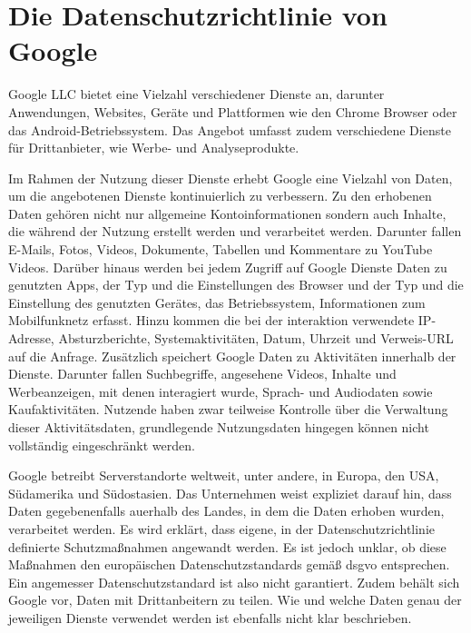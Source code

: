 \section{Die Datenschutzrichtlinie von Google}\label{sec:DatenschutzGoogle}
Google LLC bietet eine Vielzahl verschiedener Dienste an, darunter Anwendungen, Websites, Geräte und Plattformen wie den Chrome Browser oder das Android-Betriebssystem. Das Angebot umfasst zudem verschiedene Dienste für Drittanbieter, wie Werbe- und Analyseprodukte. 

Im Rahmen der Nutzung dieser Dienste erhebt Google eine Vielzahl von Daten, um die angebotenen Dienste kontinuierlich zu verbessern. Zu den erhobenen Daten gehören nicht nur allgemeine Kontoinformationen sondern auch Inhalte, die während der Nutzung erstellt werden und verarbeitet werden. Darunter fallen E-Mails, Fotos, Videos, Dokumente, Tabellen und Kommentare zu YouTube Videos. Darüber hinaus werden bei jedem Zugriff auf Google Dienste Daten zu genutzten Apps, der Typ und die Einstellungen des Browser und der Typ und die Einstellung des genutzten Gerätes, das Betriebssystem, Informationen zum Mobilfunknetz erfasst. Hinzu kommen die bei der interaktion verwendete IP-Adresse, Absturzberichte, Systemaktivitäten, Datum, Uhrzeit und Verweis-URL auf die Anfrage. Zusätzlich speichert Google Daten zu Aktivitäten innerhalb der Dienste. Darunter fallen Suchbegriffe, angesehene Videos, Inhalte und Werbeanzeigen, mit denen interagiert wurde, Sprach- und Audiodaten sowie Kaufaktivitäten. Nutzende haben zwar teilweise Kontrolle über die Verwaltung dieser Aktivitätsdaten, grundlegende Nutzungsdaten hingegen können nicht vollständig eingeschränkt werden. 

Google betreibt Serverstandorte weltweit, unter andere, in Europa, den USA, Südamerika und Südostasien. Das Unternehmen weist expliziet darauf hin, dass Daten gegebenenfalls auerhalb des Landes, in dem die Daten erhoben wurden, verarbeitet werden. Es wird erklärt, dass eigene, in der Datenschutzrichtlinie definierte Schutzmaßnahmen angewandt werden. Es ist jedoch unklar, ob diese Maßnahmen den europäischen Datenschutzstandards gemäß \gls{dsgvo} entsprechen. Ein angemesser Datenschutzstandard ist also nicht garantiert. Zudem behält sich Google vor, Daten mit Drittanbeitern zu teilen. Wie und welche Daten genau der jeweiligen Dienste verwendet werden ist ebenfalls nicht klar beschrieben. 


